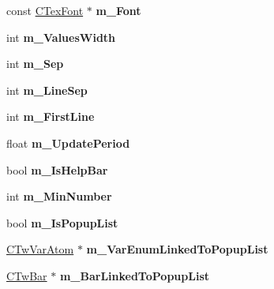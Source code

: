 \begin{DoxyCompactItemize}
\item 
\hypertarget{struct_c_tw_bar_acb217256c9c4bbec3bd890687365706b}{const \hyperlink{struct_c_tex_font}{C\+Tex\+Font} $\ast$ {\bfseries m\+\_\+\+Font}}\label{struct_c_tw_bar_acb217256c9c4bbec3bd890687365706b}

\item 
\hypertarget{struct_c_tw_bar_a40ab915c58882a46bf39c7c8cd231c4b}{int {\bfseries m\+\_\+\+Values\+Width}}\label{struct_c_tw_bar_a40ab915c58882a46bf39c7c8cd231c4b}

\item 
\hypertarget{struct_c_tw_bar_a64076fa87f1a06417e3d2b6819108c26}{int {\bfseries m\+\_\+\+Sep}}\label{struct_c_tw_bar_a64076fa87f1a06417e3d2b6819108c26}

\item 
\hypertarget{struct_c_tw_bar_ab6000acf9b4b22cac511b6e20147a814}{int {\bfseries m\+\_\+\+Line\+Sep}}\label{struct_c_tw_bar_ab6000acf9b4b22cac511b6e20147a814}

\item 
\hypertarget{struct_c_tw_bar_a4cd8d4e8b8f7786eb3b719ea28724763}{int {\bfseries m\+\_\+\+First\+Line}}\label{struct_c_tw_bar_a4cd8d4e8b8f7786eb3b719ea28724763}

\item 
\hypertarget{struct_c_tw_bar_a6b2de97d914c6188326d62f7028cf7e5}{float {\bfseries m\+\_\+\+Update\+Period}}\label{struct_c_tw_bar_a6b2de97d914c6188326d62f7028cf7e5}

\item 
\hypertarget{struct_c_tw_bar_a7615d697bf65fc025b9dbb549898339b}{bool {\bfseries m\+\_\+\+Is\+Help\+Bar}}\label{struct_c_tw_bar_a7615d697bf65fc025b9dbb549898339b}

\item 
\hypertarget{struct_c_tw_bar_af685af772950cd57e3c6bb1117764c65}{int {\bfseries m\+\_\+\+Min\+Number}}\label{struct_c_tw_bar_af685af772950cd57e3c6bb1117764c65}

\item 
\hypertarget{struct_c_tw_bar_a5d1d46d8ce01d2ee15efb468bd6c7bff}{bool {\bfseries m\+\_\+\+Is\+Popup\+List}}\label{struct_c_tw_bar_a5d1d46d8ce01d2ee15efb468bd6c7bff}

\item 
\hypertarget{struct_c_tw_bar_a3ec00d4f34c66e6d280aaee628217812}{\hyperlink{struct_c_tw_var_atom}{C\+Tw\+Var\+Atom} $\ast$ {\bfseries m\+\_\+\+Var\+Enum\+Linked\+To\+Popup\+List}}\label{struct_c_tw_bar_a3ec00d4f34c66e6d280aaee628217812}

\item 
\hypertarget{struct_c_tw_bar_ac7c9c759e5b59a5347f1850cee127ccb}{\hyperlink{struct_c_tw_bar}{C\+Tw\+Bar} $\ast$ {\bfseries m\+\_\+\+Bar\+Linked\+To\+Popup\+List}}\label{struct_c_tw_bar_ac7c9c759e5b59a5347f1850cee127ccb}


\end{DoxyCompactItemize}
